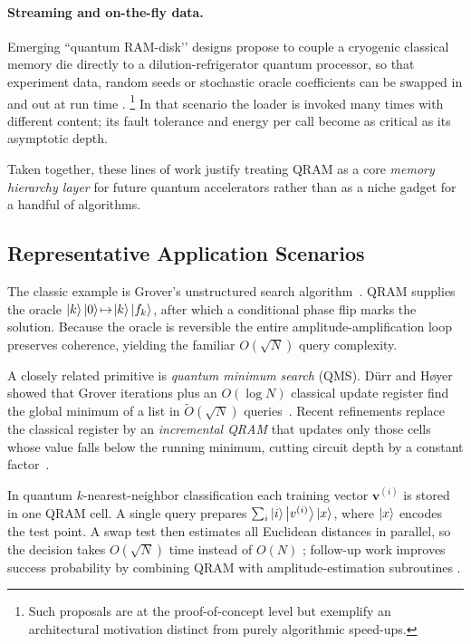 \documentclass[11pt]{article}
\begin{document}
\paragraph{Streaming and on-the-fly data.}
Emerging “quantum RAM-disk’’ designs propose to couple a cryogenic
classical memory die directly to a dilution-refrigerator quantum
processor, so that experiment data, random seeds or stochastic oracle
coefficients can be swapped in and out at run time
\cite{Zhang2024}.%
\footnote{Such proposals are at the proof-of-concept level but
exemplify an architectural motivation distinct from purely algorithmic
speed-ups.}
In that scenario the loader is invoked many times with different
content; its fault tolerance and energy per call become as critical as
its asymptotic depth.

Taken together, these lines of work justify treating QRAM as a core
\emph{memory hierarchy layer} for future quantum accelerators rather
than as a niche gadget for a handful of algorithms.



\subsection{Representative Application Scenarios}

The classic example is Grover’s unstructured search
algorithm~\cite{Grover1996}.
QRAM supplies the oracle
$\ket{k}\ket{0}\!\mapsto\!\ket{k}\ket{f_{k}}$,
after which a conditional phase flip marks the solution.
Because the oracle is reversible the entire amplitude-amplification
loop preserves coherence, yielding the familiar
$O(\sqrt{N})$ query complexity.

A closely related primitive is \textit{quantum minimum search} (QMS).
Dürr and Høyer showed that Grover iterations plus an
$O(\log N)$ classical update register find the global minimum of a list
in $\widetilde{O}(\sqrt{N})$ queries~\cite{DurrHoyer1996}.
Recent refinements replace the classical register by an
\textit{incremental QRAM} that updates only those cells whose value
falls below the running minimum, cutting circuit depth by a constant
factor~\cite{Nakaji2021}.

In quantum $k$-nearest-neighbor classification each training vector
$\mathbf{v}^{(i)}$ is stored in one QRAM cell.
A single query prepares
$\sum_{i}\ket{i}\ket{v^{(i)}}\ket{x}$,
where $\ket{x}$ encodes the test point.
A swap test then estimates all Euclidean distances in parallel, so the
decision takes $O(\sqrt{N})$ time instead of $O(N)$
\cite{Wiebe2015}; follow-up work improves success probability by
combining QRAM with amplitude-estimation subroutines
\cite{Zoufal2022}.
\end{document}

